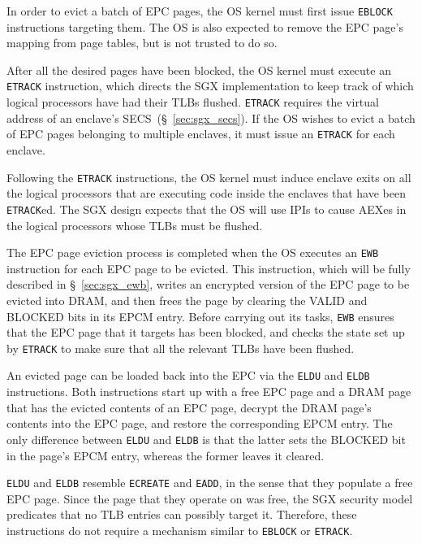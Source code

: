 
In order to evict a batch of EPC pages, the OS kernel must first issue
\texttt{EBLOCK} instructions targeting them. The OS is also expected to remove
the EPC page's mapping from page tables, but is not trusted to do so.

After all the desired pages have been blocked, the OS kernel must execute an
\texttt{ETRACK} instruction, which directs the SGX implementation to keep track
of which logical processors have had their TLBs flushed. \texttt{ETRACK}
requires the virtual address of an enclave's SECS~(\S~\ref{sec:sgx_secs}). If
the OS wishes to evict a batch of EPC pages belonging to multiple enclaves, it
must issue an \texttt{ETRACK} for each enclave.

Following the \texttt{ETRACK} instructions, the OS kernel must induce enclave
exits on all the logical processors that are executing code inside the enclaves
that have been \texttt{ETRACK}ed. The SGX design expects that the OS will use
IPIs to cause AEXes in the logical processors whose TLBs must be flushed.

The EPC page eviction process is completed when the OS executes an \texttt{EWB}
instruction for each EPC page to be evicted. This instruction, which will be
fully described in \S~\ref{sec:sgx_ewb}, writes an encrypted version of the EPC
page to be evicted into DRAM, and then frees the page by clearing the VALID and
BLOCKED bits in its EPCM entry. Before carrying out its tasks, \texttt{EWB}
ensures that the EPC page that it targets has been blocked, and checks the
state set up by \texttt{ETRACK} to make sure that all the relevant TLBs have
been flushed.

An evicted page can be loaded back into the EPC via the \texttt{ELDU} and
\texttt{ELDB} instructions. Both instructions start up with a free EPC page and
a DRAM page that has the evicted contents of an EPC page, decrypt the DRAM
page's contents into the EPC page, and restore the corresponding EPCM entry.
The only difference between \texttt{ELDU} and \texttt{ELDB} is that the latter
sets the BLOCKED bit in the page's EPCM entry, whereas the former leaves it
cleared.

\texttt{ELDU} and \texttt{ELDB} resemble \texttt{ECREATE} and \texttt{EADD},
in the sense that they populate a free EPC page. Since the page that they
operate on was free, the SGX security model predicates that no TLB entries can
possibly target it. Therefore, these instructions do not require a mechanism
similar to \texttt{EBLOCK} or \texttt{ETRACK}.


